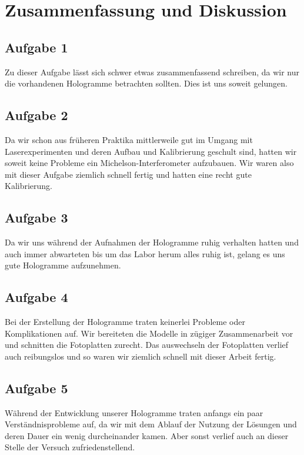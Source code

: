 \section{Zusammenfassung und Diskussion}

\subsection{Aufgabe 1}
Zu dieser Aufgabe lässt sich schwer etwas zusammenfassend schreiben, da wir nur die vorhandenen Hologramme betrachten sollten. Dies ist uns soweit gelungen.

\subsection{Aufgabe 2}
Da wir schon aus früheren Praktika mittlerweile gut im Umgang mit Laserexperimenten und deren Aufbau und Kalibrierung geschult sind, hatten wir soweit keine Probleme ein Michelson-Interferometer aufzubauen. Wir waren also mit dieser Aufgabe ziemlich schnell fertig und hatten eine recht gute Kalibrierung.

\subsection{Aufgabe 3}
Da wir uns während der Aufnahmen der Hologramme ruhig verhalten hatten und auch immer abwarteten  bis um das Labor herum alles ruhig ist, gelang es uns gute Hologramme aufzunehmen.

\subsection{Aufgabe 4}
Bei der Erstellung der Hologramme traten keinerlei Probleme oder Komplikationen auf. Wir bereiteten die Modelle in zügiger Zusammenarbeit vor und schnitten die Fotoplatten zurecht. Das auswechseln der Fotoplatten verlief auch reibungslos und so waren wir ziemlich schnell mit dieser Arbeit fertig.

\subsection{Aufgabe 5}
Während der Entwicklung unserer Hologramme traten anfangs ein paar Verständnisprobleme auf, da wir mit dem Ablauf der Nutzung der Lösungen und deren Dauer ein wenig durcheinander kamen. Aber sonst verlief auch an dieser Stelle der Versuch zufriedenstellend.